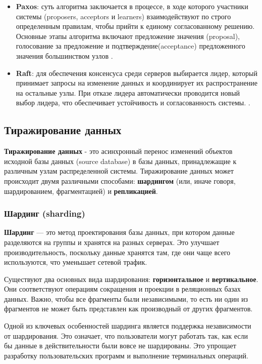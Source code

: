 \begin{itemize} 
    \item \textbf{Paxos}: суть алгоритма заключается в процессе, в ходе которого участники системы (proposers, acceptors и learners) взаимодействуют по строго определенным правилам, 
    чтобы прийти к единому согласованному решению. Основные этапы алгоритма включают предложение значения (proposal), голосование за предложение и подтверждение(acceptance) предложенного 
    значения большинством узлов \autocite{paxos}. 
    \item \textbf{Raft}: для обеспечения консенсуса среди серверов выбирается лидер, который принимает запросы на изменение данных и координирует их распространение на остальные узлы. 
    При отказе лидера автоматически проводится новый выбор лидера, что обеспечивает устойчивость и согласованность системы. \autocite{raft}. 
\end{itemize}


\subsection{Тиражирование данных}

\textbf{Тиражирование данных} - это асинхронный перенос изменений объектов исходной базы данных (source database)
в базы данных, принадлежащие к различным узлам распределенной системы. Тиражирование данных может происходит
двумя различными способами: \textbf{шардингом} (или, иначе говоря, шардированием, фрагментацией) и \textbf{репликацией}.

\subsubsection{Шардинг (sharding)}

\textbf{Шардинг} — это метод проектирования базы данных, при котором данные разделяются на группы и хранятся на разных серверах. Это улучшает производительность, поскольку данные хранятся там, где они чаще всего используются, что уменьшает сетевой трафик.

Существуют два основных вида шардирования: \textbf{горизонтальное} и \textbf{вертикальное}. Они соответствуют операциям сокращения и проекции в реляционных базах данных. Важно, чтобы все фрагменты были независимыми, то есть ни один из фрагментов не может быть представлен как производный от других фрагментов.

Одной из ключевых особенностей шардинга является поддержка независимости от шардирования. Это означает, что пользователи могут работать так, как если бы данные в действительности были вовсе не шардированы. Это упрощает разработку пользовательских программ и выполнение терминальных операций.

